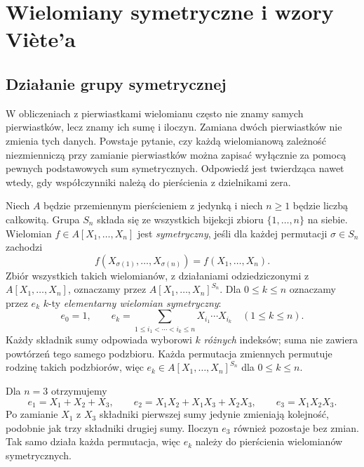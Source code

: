 \chapter{Wielomiany symetryczne i wzory Viète'a}\label{aa:ch:symmetric-polynomials}
\section{Działanie grupy symetrycznej}

W obliczeniach z pierwiastkami wielomianu często nie znamy samych
pierwiastków, lecz znamy ich sumę i iloczyn. Zamiana dwóch
pierwiastków nie zmienia tych danych. Powstaje pytanie, czy każdą
wielomianową zależność niezmienniczą przy zamianie pierwiastków
można zapisać wyłącznie za pomocą pewnych podstawowych sum
symetrycznych. Odpowiedź jest twierdząca nawet wtedy, gdy
współczynniki należą do pierścienia z dzielnikami zera.

\begin{definicja}\label{aa:def:symmetric-poly}
Niech $A$ będzie przemiennym pierścieniem z jedynką
i niech $n\ge1$ będzie liczbą całkowitą. Grupa $S_n$ składa się
ze wszystkich bijekcji zbioru $\{1,\ldots,n\}$ na siebie.
Wielomian $f\in A[X_1,\ldots,X_n]$ jest
\emph{symetryczny}, jeśli dla każdej permutacji $\sigma\in S_n$
zachodzi
\[
 f(X_{\sigma(1)},\ldots,X_{\sigma(n)})=f(X_1,\ldots,X_n).
\]
Zbiór wszystkich takich wielomianów, z działaniami odziedziczonymi
z $A[X_1,\ldots,X_n]$, oznaczamy przez
$A[X_1,\ldots,X_n]^{S_n}$.
Dla $0\le k\le n$ oznaczamy przez $e_k$ $k$-ty
\emph{elementarny wielomian symetryczny}:
\[
 e_0=1,\qquad
 e_k=\sum_{1\le i_1<\cdots<i_k\le n}X_{i_1}\cdots X_{i_k}
 \quad(1\le k\le n).
\]
Każdy składnik sumy odpowiada wyborowi $k$ \emph{różnych}
indeksów; suma nie zawiera powtórzeń tego samego podzbioru.
Każda permutacja zmiennych permutuje rodzinę takich podzbiorów,
więc $e_k\in A[X_1,\ldots,X_n]^{S_n}$ dla $0\le k\le n$.
\end{definicja}

\begin{przyklad}
Dla $n=3$ otrzymujemy
\[
 e_1=X_1+X_2+X_3,\qquad
 e_2=X_1X_2+X_1X_3+X_2X_3,\qquad
 e_3=X_1X_2X_3.
\]
Po zamianie $X_1$ z $X_3$ składniki pierwszej sumy jedynie
zmieniają kolejność, podobnie jak trzy składniki drugiej sumy.
Iloczyn $e_3$ również pozostaje bez zmian. Tak samo działa
każda permutacja, więc $e_k$ należy do pierścienia wielomianów
symetrycznych.
\end{przyklad}

